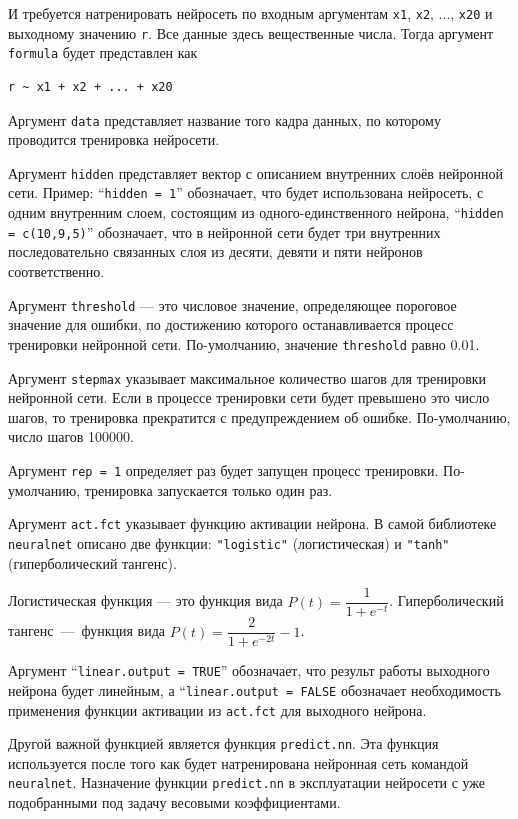 \documentclass[12pt]{article}
\begin{document}
  И требуется натренировать нейросеть по входным аргументам \verb|x1|, \verb|x2|, ..., \verb|x20| и выходному значению \verb|r|. Все данные здесь вещественные числа. Тогда аргумент \verb|formula| будет представлен как

\begin{verbatim}
r ~ x1 + x2 + ... + x20
\end{verbatim}

  Аргумент \verb|data| представляет название того кадра данных, по которому проводится тренировка нейросети.

  Аргумент \verb|hidden| представляет вектор с описанием внутренних слоёв нейронной сети. Пример: ``\verb|hidden = 1|'' обозначает, что будет использована нейросеть, с одним внутренним слоем, состоящим из одного-единственного нейрона, ``\verb|hidden = c(10,9,5)|'' обозначает, что в нейронной сети будет три внутренних последовательно связанных слоя из десяти, девяти и пяти нейронов соответственно.

  Аргумент \verb|threshold| --- это числовое значение, определяющее пороговое значение для ошибки, по достижению которого останавливается процесс тренировки нейронной сети. По-умолчанию, значение \verb|threshold| равно 0.01.

  Аргумент \verb|stepmax| указывает максимальное количество шагов для тренировки нейронной сети. Если в процессе тренировки сети будет превышено это число шагов, то тренировка прекратится с предупреждением об ошибке. По-умолчанию, число шагов 100000.

  Аргумент \verb|rep = 1| определяет раз будет запущен процесс тренировки. По-умолчанию, тренировка запускается только один раз.

  Аргумент \verb|act.fct| указывает функцию активации нейрона. В самой библиотеке \verb|neuralnet| описано две функции: \verb|"logistic"| (логистическая) и \verb|"tanh"| (гиперболический тангенс).

  Логистическая функция --- это функция вида $P(t) = \dfrac {1} {1+e^{-t}}$.
  Гиперболический тангенс~---~функция вида $P(t) = \dfrac {2} {1 + e^{-2t}} - 1$.

  Аргумент ``\verb|linear.output = TRUE|'' обозначает, что результ работы выходного нейрона будет линейным, а ``\verb|linear.output = FALSE| обозначает необходимость применения функции активации из \verb|act.fct| для выходного нейрона.

  Другой важной функцией является функция \verb|predict.nn|. Эта функция используется после того как будет натренирована нейронная сеть командой \verb|neuralnet|. Назначение функции \verb|predict.nn| в эксплуатации нейросети с уже подобранными под задачу весовыми коэффициентами.
\end{document}
